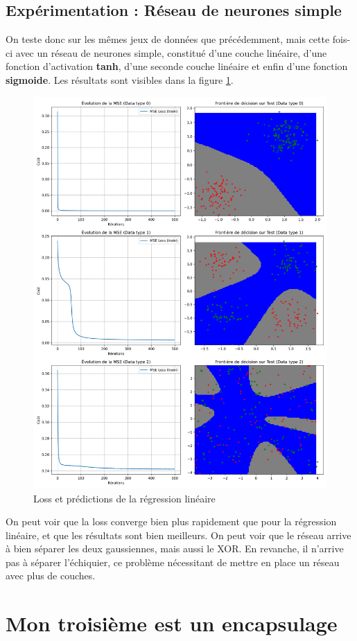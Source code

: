 \documentclass{article}
\begin{document}
\subsection{Expérimentation : Réseau de neurones simple}

On teste donc sur les mêmes jeux de données que précédemment, mais cette fois-ci avec un réseau de neurones simple, constitué d'une couche linéaire, d'une fonction d'activation \textbf{tanh}, d'une seconde couche linéaire et enfin d'une fonction \textbf{sigmoide}. Les résultats sont visibles dans la figure \ref{fig:simplenn}.

\begin{figure}[H]
    \centering
    \includegraphics[width=0.8\linewidth]{Images/sigmoide_tanh_combined.png}
    \caption{Loss et prédictions de la régression linéaire}
	\label{fig:simplenn}
\end{figure}

On peut voir que la loss converge bien plus rapidement que pour la régression linéaire, et que les résultats sont bien meilleurs. On peut voir que le réseau arrive à bien séparer les deux gaussiennes, mais aussi le XOR. En revanche, il n'arrive pas à séparer l'échiquier, ce problème nécessitant de mettre en place un réseau avec plus de couches.

\section{Mon troisième est un encapsulage}
\end{document}
